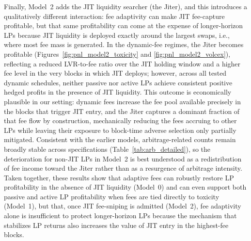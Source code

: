 \documentclass[11pt]{article}
\begin{document}
Finally, Model~2 adds the JIT liquidity searcher (the Jiter), and this introduces a qualitatively different interaction: 
fee adaptivity can make JIT fee-capture profitable, but that same profitability can come at the expense of longer-horizon LPs 
because JIT liquidity is deployed exactly around the largest swaps, i.e., where most fee mass is generated. In the dynamic-fee 
regimes, the Jiter becomes profitable (Figures~\ref{fig:pnl_model2_toxicity} and \ref{fig:pnl_model2_volcex}), reflecting a reduced 
LVR-to-fee ratio over the JIT holding window and a higher fee level in the very blocks in which JIT deploys; however, across all
 tested dynamic schedules, neither passive nor active LPs achieve consistent positive hedged profits in the presence of JIT liquidity. 
 This outcome is economically plausible in our setting: dynamic fees increase the fee pool available precisely in the blocks that 
 trigger JIT entry, and the Jiter captures a dominant fraction of that fee flow by construction, mechanically reducing the fees 
 accruing to other LPs while leaving their exposure to block-time adverse selection only partially mitigated. Consistent with the 
 earlier models, arbitrage-related counts remain broadly stable across specifications (Table~\ref{tab:arb_detailed}), so the 
 deterioration for non-JIT LPs in Model~2 is best understood as a redistribution of fee income toward the Jiter rather than as a 
 resurgence of arbitrage intensity. Taken together, these results show that adaptive fees can robustly restore LP profitability in 
 the absence of JIT liquidity (Model~0) and can even support both passive and active LP profitability when fees are tied directly 
 to toxicity (Model~1), but that, once JIT fee-sniping is admitted (Model~2), fee adaptivity alone is insufficient to protect 
 longer-horizon LPs because the mechanism that stabilizes LP returns also increases the value of JIT entry in the highest-fee blocks.


\end{document}
